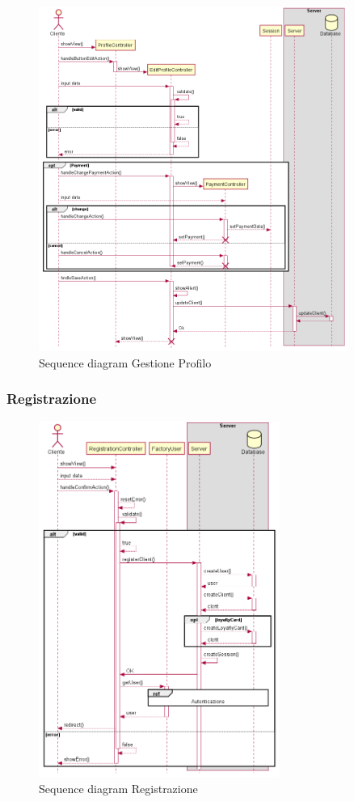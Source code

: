 \documentclass[12pt, a4paper]{report}
\begin{document}
\begin{figure}[h]
  \centering
  \includegraphics[width=0.9\textwidth]{profile_sequence.png}
  \caption{Sequence diagram Gestione Profilo}
\end{figure}

\newpage

\subsubsection{Registrazione}

\begin{figure}[ht]
  \centering
  \includegraphics[width=0.7\textwidth]{registration_sequence.png}
  \caption{Sequence diagram Registrazione}
\end{figure}
\end{document}
